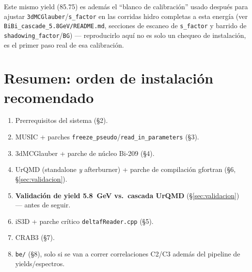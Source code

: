 \documentclass[11pt]{article}
\begin{document}
Este mismo yield (85.75) es además el ``blanco de calibración'' usado
después para ajustar \texttt{3dMCGlauber}/\texttt{s\_factor} en las
corridas hidro completas a esta energía (ver
\texttt{BiBi\_cascade\_5.8GeV/README.md}, secciones de escaneo de
\texttt{s\_factor} y barrido de \texttt{shadowing\_factor}/\texttt{BG}) ---
reproducirlo aquí no es solo un chequeo de instalación, es el primer paso
real de esa calibración.

\section{Resumen: orden de instalación recomendado}

\begin{enumerate}
  \item Prerrequisitos del sistema (\S2).
  \item MUSIC + parches \texttt{freeze\_pseudo}/\texttt{read\_in\_parameters}
  (\S3).
  \item 3dMCGlauber + parche de núcleo Bi-209 (\S4).
  \item UrQMD (standalone \emph{y} afterburner) + parche de compilación
  gfortran (\S6, \S\ref{sec:validacion}).
  \item \textbf{Validación de yield 5.8~GeV vs.\ cascada UrQMD}
  (\S\ref{sec:validacion}) --- antes de seguir.
  \item iS3D + parche crítico \texttt{deltafReader.cpp} (\S5).
  \item CRAB3 (\S7).
  \item \texttt{be/} (\S8), solo si se van a correr correlaciones C2/C3
  además del pipeline de yields/espectros.
\end{enumerate}
\end{document}
